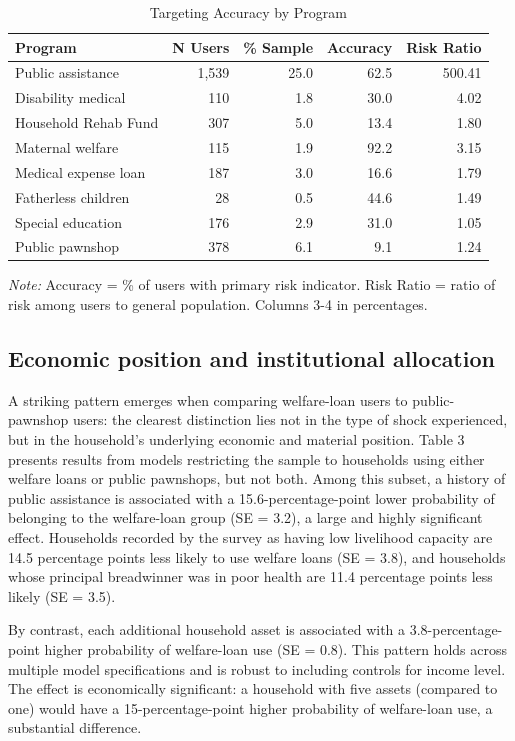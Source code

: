 \documentclass[12pt,a4paper]{article}
\begin{document}
\begin{table}[!h]
\centering
\small
\caption{Targeting Accuracy by Program}
\label{tab:targeting}
\begin{tabular}{lrrrr}
\toprule
Program & N Users & \% Sample & Accuracy & Risk Ratio \\
\midrule
Public assistance & 1,539 & 25.0 & 62.5 & 500.41 \\
Disability medical & 110 & 1.8 & 30.0 & 4.02 \\
Household Rehab Fund & 307 & 5.0 & 13.4 & 1.80 \\
Maternal welfare & 115 & 1.9 & 92.2 & 3.15 \\
Medical expense loan & 187 & 3.0 & 16.6 & 1.79 \\
Fatherless children & 28 & 0.5 & 44.6 & 1.49 \\
Special education & 176 & 2.9 & 31.0 & 1.05 \\
Public pawnshop & 378 & 6.1 & 9.1 & 1.24 \\
\bottomrule
\end{tabular}

\noindent\small\emph{Note:} Accuracy = \% of users with primary risk indicator. Risk Ratio = ratio of risk among users to general population. Columns 3-4 in percentages.
\end{table}

\subsection{Economic position and institutional allocation}

A striking pattern emerges when comparing welfare-loan users to public-pawnshop users: the clearest distinction lies not in the type of shock experienced, but in the household's underlying economic and material position. Table 3 presents results from models restricting the sample to households using either welfare loans or public pawnshops, but not both. Among this subset, a history of public assistance is associated with a 15.6-percentage-point lower probability of belonging to the welfare-loan group (SE = 3.2), a large and highly significant effect. Households recorded by the survey as having low livelihood capacity are 14.5 percentage points less likely to use welfare loans (SE = 3.8), and households whose principal breadwinner was in poor health are 11.4 percentage points less likely (SE = 3.5).

By contrast, each additional household asset is associated with a 3.8-percentage-point higher probability of welfare-loan use (SE = 0.8). This pattern holds across multiple model specifications and is robust to including controls for income level. The effect is economically significant: a household with five assets (compared to one) would have a 15-percentage-point higher probability of welfare-loan use, a substantial difference.
\end{document}
